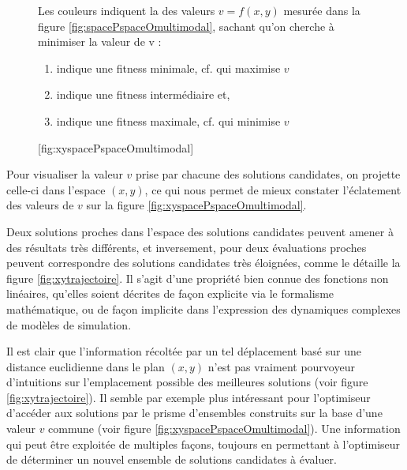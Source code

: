 \begin{figure}[!htbp]
	\begin{sidecaption}[fortoc]{Les couleurs indiquent la  des valeurs $v = f(x,y)$ mesurée dans la figure \ref{fig:spacePspaceOmultimodal}, sachant qu'on cherche à minimiser la valeur de v :
\parbox{\marginparwidth}{
\begin{enumerate}[label={},labelindent=0pt,leftmargin=*]
        \item {} indique une fitness minimale, cf. qui maximise $v$
        \item {} indique une fitness intermédiaire et,
        \item {} indique une fitness maximale, cf. qui minimise $v$
\end{enumerate}}}[fig:xyspacePspaceOmultimodal]
	 \centering
	\end{sidecaption}
\end{figure}

Pour visualiser la valeur $v$ prise par chacune des solutions candidates, on projette celle-ci dans l'espace $(x,y)$, ce qui nous permet de mieux constater l'éclatement des valeurs de $v$ sur la figure \ref{fig:xyspacePspaceOmultimodal}.

Deux solutions proches dans l'espace des solutions candidates peuvent amener à des résultats très différents, et inversement, pour deux évaluations proches peuvent correspondre des solutions candidates très éloignées, comme le détaille la figure \ref{fig:xytrajectoire}. Il s'agit d'une propriété bien connue des fonctions non linéaires, qu'elles soient décrites de façon explicite via le formalisme mathématique, ou de façon implicite dans l'expression des dynamiques complexes de modèles de simulation.

Il est clair que l'information récoltée par un tel déplacement basé sur une distance euclidienne dans le plan $(x,y)$ n'est pas vraiment pourvoyeur d'intuitions sur l'emplacement possible des meilleures solutions (voir figure \ref{fig:xytrajectoire}). Il semble par exemple plus intéressant pour l'optimiseur d'accéder aux solutions par le prisme d'ensembles construits sur la base d'une valeur $v$ commune (voir figure \ref{fig:xyspacePspaceOmultimodal}). Une information qui peut être exploitée de multiples façons, toujours en permettant à l'optimiseur de déterminer un nouvel ensemble de solutions candidates à évaluer.

